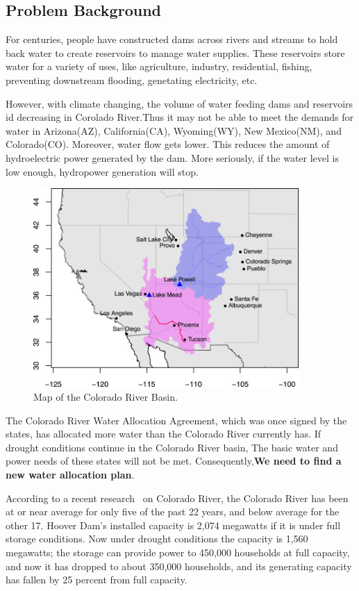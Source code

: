 \subsection{Problem Background}
For centuries, people have constructed dams across rivers and streams to hold back water to create reservoirs to manage water supplies. These reservoirs store water for a variety of uses, like agriculture, industry, residential, fishing, preventing downstream flooding, genetating electricity, etc. 
\par
However, with climate changing, the volume of water feeding dams and reservoirs id decreasing in Corolado River.Thus it may not be able to meet the demands for water in Arizona(AZ), California(CA), Wyoming(WY), New Mexico(NM), and Colorado(CO). Moreover, water flow gets lower. This reduces the amount of hydroelectric power generated by the dam. More seriously, if the water level is low enough, hydropower generation will stop.
\begin{figure}[H]
    \centering
    \label{figureIntro}
    \includegraphics[width=0.9\textwidth]{figures/Map_of_ the_Colorado_River_Basin.png}
    \caption{Map of the Colorado River Basin.}
\end{figure}
\par
The Colorado River Water Allocation Agreement, which was once signed by the states, has allocated more water than the Colorado River currently has. If drought conditions continue in the Colorado River basin, The basic water and power needs of these states will not be met. Consequently,\textbf{We need to find a new water allocation plan}.
\par
According to a recent research~\cite{whitepaper} on Colorado River, the Colorado River has been at or near average for only five of the past 22 years, and below average for the other 17. Hoover Dam's installed capacity is 2,074 megawatts if it is under full storage conditions. Now under drought conditions the capacity is 1,560 megawatts; the storage can provide power to 450,000 households at full capacity, and now it has dropped to about 350,000 households, and its generating capacity has fallen by 25 percent from full capacity.